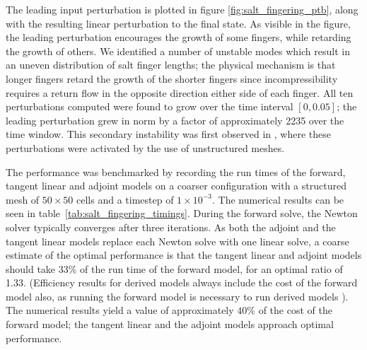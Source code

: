 \documentclass{siamltex}
\begin{document}
The leading input perturbation is plotted in figure \ref{fig:salt_fingering_ptb}, along with the
resulting linear perturbation to the final state. As visible in the figure, the leading perturbation
encourages the growth of some fingers, while retarding the growth of others. We identified a number
of unstable modes which result in an uneven distribution of salt finger lengths; the physical
mechanism is that longer fingers retard the growth of the shorter fingers since incompressibility
requires a return flow in the opposite direction either side of each finger.  All ten perturbations
computed were found to grow over the time interval $[0, 0.05]$; the leading perturbation grew in
norm by a factor of approximately 2235 over the time window. This secondary instability was first
observed in \cite{mactavish2013}, where these perturbations were activated by the use of unstructured
meshes.

The performance was benchmarked by recording the run times of the forward, tangent linear and
adjoint models on a coarser configuration with a structured mesh of $50 \times 50$ cells and a timestep of
$1 \times 10^{-3}$.  The numerical results can be seen in table~\ref{tab:salt_fingering_timings}.
During the forward solve, the Newton solver typically converges after three iterations.  As both the
adjoint and the tangent linear models replace each Newton solve with one linear solve, a coarse
estimate of the optimal performance is that the tangent linear and adjoint models should take $33\%$
of the run time of the forward model, for an optimal ratio of 1.33. (Efficiency results for derived
models always include the cost of the forward model also, as running the forward model is necessary
to run derived models \citep{naumann2011}).  The numerical results yield a value of approximately $40\%$ of
the cost of the forward model; the tangent linear and the adjoint models approach
optimal performance.
\end{document}
